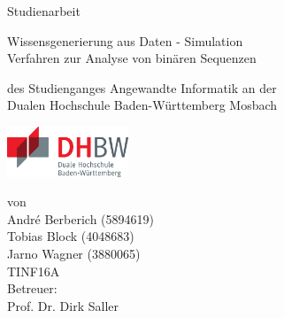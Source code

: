 \def\doctype{Studienarbeit}
\def\title{
Wissensgenerierung aus Daten - Simulation \\
Verfahren zur Analyse von binären Sequenzen
}

\begin{titlepage}

\vspace{10mm}

\begin{center}
	\vspace{5mm}
	
	\huge \doctype
	
	\vspace{14.2pt}
	
	\huge \title
	
	
	
	
	\vspace{32.6pt}
	
	\small des Studienganges Angewandte Informatik an der \\
	\large Dualen Hochschule Baden-Württemberg Mosbach
    
    \vspace{14.2pt}
    
    \includegraphics[height=1.5cm]{prefix/image/logo-dhbw.eps}

	\vspace{42.6pt}
	
	\small von \\
	\large André Berberich (5894619) \\
	\large Tobias Block (4048683) \\
	\large Jarno Wagner (3880065) \\
	TINF16A \\
	
	
	 \vspace{14.2pt}
	\small Betreuer: \\
	\normalsize Prof. Dr. Dirk Saller
	
\end{center}

\vspace{42.6pt}



\vspace{49.7pt}


\end{titlepage}